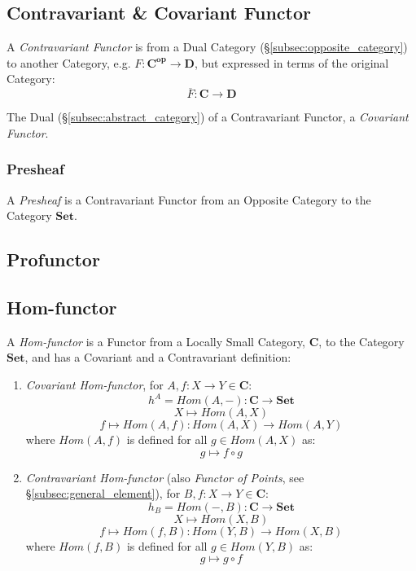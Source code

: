 \subsection{Contravariant \& Covariant Functor}
\label{subsec:contravariant_functor}

A \emph{Contravariant Functor} is from a Dual Category
(\S\ref{subsec:opposite_category}) to another Category, e.g. $F :
\mathbf{C^{op}} \rightarrow \mathbf{D}$, but expressed in terms of the
original Category:
\[
    \overline{F} : \mathbf{C} \rightarrow \mathbf{D}
\]

The Dual (\S\ref{subsec:abstract_category}) of a Contravariant
Functor, a \emph{Covariant Functor}.



\subsubsection{Presheaf}\label{subsec:presheaf}

A \emph{Presheaf} is a Contravariant Functor from an Opposite Category
to the Category $\mathbf{Set}$.



\subsection{Profunctor}\label{subsec:profunctor}



\subsection{Hom-functor}\label{subsec:hom_functor}

A \emph{Hom-functor} is a Functor from a Locally Small Category,
$\mathbf{C}$, to the Category $\mathbf{Set}$, and has a Covariant and
a Contravariant definition:

\begin{enumerate}
    \item \emph{Covariant Hom-functor}, for $A,f : X \rightarrow Y \in
      \mathbf{C}$:
\[
    h^A = Hom(A,-) : \mathbf{C} \rightarrow \mathbf{Set}
\]\[
    X \mapsto Hom(A,X)
\]\[
    f \mapsto Hom(A,f) : Hom(A,X) \rightarrow Hom(A,Y)
\]
    where $Hom(A,f)$ is defined for all $g \in Hom(A,X)$ as:
\[
    g \mapsto f \circ g
\]

    \item \emph{Contravariant Hom-functor} (also \emph{Functor of
      Points}, see \S\ref{subsec:general_element}), for $B,f : X
      \rightarrow Y \in \mathbf{C}$:
\[
    h_B = Hom(-,B) : \mathbf{C} \rightarrow \mathbf{Set}
\]\[
    X \mapsto Hom(X,B)
\]\[
    f \mapsto Hom(f,B) : Hom(Y,B) \rightarrow Hom(X,B)
\]
    where $Hom(f,B)$ is defined for all $g \in Hom(Y,B)$ as:
\[
    g \mapsto g \circ f
\]
\end{enumerate}

